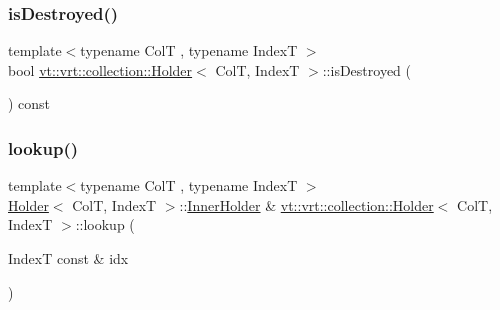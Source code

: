 \mbox{\label{structvt_1_1vrt_1_1collection_1_1_holder_a974126763d197024453d3ed2dcc9d215}} 
\subsubsection{\texorpdfstring{is\+Destroyed()}{isDestroyed()}}
{\footnotesize\ttfamily template$<$typename ColT , typename IndexT $>$ \\
bool \hyperlink{structvt_1_1vrt_1_1collection_1_1_holder}{vt\+::vrt\+::collection\+::\+Holder}$<$ ColT, IndexT $>$\+::is\+Destroyed (\begin{DoxyParamCaption}{ }\end{DoxyParamCaption}) const}

\mbox{\label{structvt_1_1vrt_1_1collection_1_1_holder_a68c05b8ae4f8755eb388f50da5c9553b}} 
\subsubsection{\texorpdfstring{lookup()}{lookup()}}
{\footnotesize\ttfamily template$<$typename ColT , typename IndexT $>$ \\
\hyperlink{structvt_1_1vrt_1_1collection_1_1_holder}{Holder}$<$ ColT, IndexT $>$\+::\hyperlink{structvt_1_1vrt_1_1collection_1_1_holder_aafc9b515450179bad7f03e17010b59f8}{Inner\+Holder} \& \hyperlink{structvt_1_1vrt_1_1collection_1_1_holder}{vt\+::vrt\+::collection\+::\+Holder}$<$ ColT, IndexT $>$\+::lookup (\begin{DoxyParamCaption}\item[{IndexT const \&}]{idx }\end{DoxyParamCaption})}

\mbox{\label{structvt_1_1vrt_1_1collection_1_1_holder_aebff9d8a0b857688bf3b303cb832b543}} 
